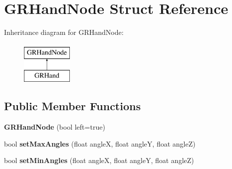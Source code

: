 \hypertarget{structGRHandNode}{}\section{G\+R\+Hand\+Node Struct Reference}
\label{structGRHandNode}
Inheritance diagram for G\+R\+Hand\+Node\+:\begin{figure}[H]
\begin{center}
\leavevmode
\includegraphics[height=2.000000cm]{structGRHandNode}
\end{center}
\end{figure}
\subsection*{Public Member Functions}
\begin{DoxyCompactItemize}
\item 
\mbox{\label{structGRHandNode_a52a577b46ae99ad7c3aef64b9d79aef2}} 
{\bfseries G\+R\+Hand\+Node} (bool left=true)
\item 
\mbox{\label{structGRHandNode_a2a3afe1b1dda0356fc1579abf0c11121}} 
bool {\bfseries set\+Max\+Angles} (float angleX, float angleY, float angleZ)
\item 
\mbox{\label{structGRHandNode_aa07bf36140dd39e158c28b14a1bda021}} 
bool {\bfseries set\+Min\+Angles} (float angleX, float angleY, float angleZ)
\end{DoxyCompactItemize}
